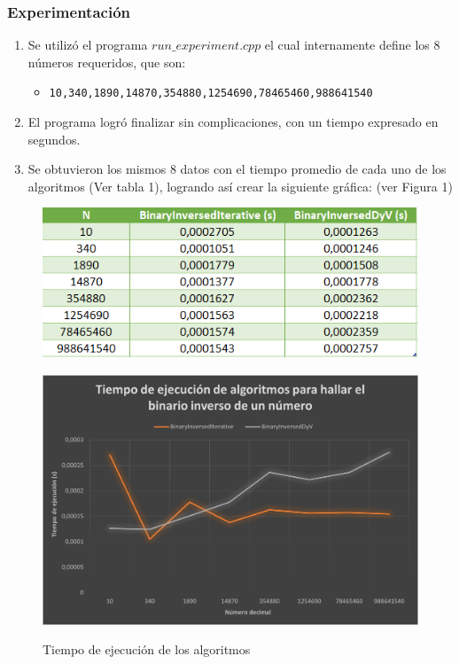 \documentclass[letter]{article}
\begin{document}
\subsubsection{Experimentación}
\begin{enumerate}
    \item Se utilizó el programa \texttt{$run\_experiment.cpp$} el cual internamente define los 8 números requeridos, que son:
    \begin{itemize}
        \item \texttt{10,340,1890,14870,354880,1254690,78465460,988641540} 
    \end{itemize}
    \item El programa logró finalizar sin complicaciones, con un tiempo expresado en segundos.
    \item Se obtuvieron los mismos 8 datos con el tiempo promedio de cada uno de los algoritmos (Ver tabla 1), logrando así crear la siguiente gráfica: (ver Figura 1)
\end{enumerate}

\begin{figure}[h]
    \centering
    \includegraphics[scale=1]{Data.png}
    \label{experimentos:aleatorias:grafica}
    
\end{figure}



\begin{figure}[h]
    \centering
    \includegraphics[scale=0.76]{DataGraphic.png}
    \label{experimentos:aleatorias:grafica}
    \caption{Tiempo de ejecución de los algoritmos}
\end{figure}
\end{document}
